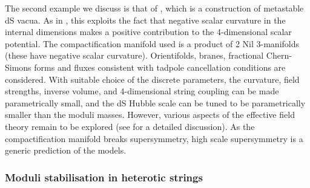The second example we discuss is that of \cite{Silverstein:2007ac}, which is a construction of metastable dS vacua. As in \cite{Saltman:2004jh}, this exploits the fact that negative scalar curvature in the internal dimensions makes a positive contribution to the 4-dimensional scalar potential. The compactification manifold used is a product of 2 Nil 3-manifolds (these have negative scalar curvature). Orientifolds, branes, fractional Chern-Simons forms  and fluxes consistent with tadpole cancellation conditions are considered. With suitable choice of the discrete parameters, the curvature, field strengths, inverse volume, and 4-dimensional string coupling can be made parametrically small, and the dS Hubble scale can be tuned to be parametrically smaller than the moduli masses. However,  various aspects of the effective field theory remain to be explored (see \cite{Haque:2008jz} for a detailed discussion). As the compactification manifold breaks supersymmetry, high scale supersymmetry is a generic prediction of the models. 

\subsubsection{Moduli stabilisation in heterotic strings}

